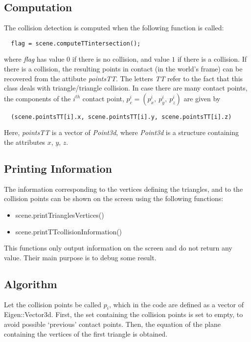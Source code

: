 \documentclass[11pt,a4paper]{article}
\begin{document}
\subsection*{Computation}
The collision detection is computed when the following function is called:
\begin{lstlisting}
  flag = scene.computeTTintersection();
\end{lstlisting}
where \textit{flag} has value $0$ if there is no collision, and value $1$ if there is a collision. If there is a collision, the resulting points in contact (in the world's frame) can be recovered from the attibute \textit{pointsTT}. The letters \textit{TT} refer to the fact that this class deals with triangle/triangle collision. In case there are many contact points, the components of the $i^{th}$ contact point, $p^i_c = (p^i_x, \ p^i_y, \ p^i_z)$ are given by
\begin{lstlisting}
  (scene.pointsTT[i].x, scene.pointsTT[i].y, scene.pointsTT[i].z)
\end{lstlisting}
Here, \textit{pointsTT} is a vector of \textit{Point3d}, where \textit{Point3d} is a structure containing the attributes $x$, $y$, $z$. 

\subsection*{Printing Information}
The information corresponding to the vertices defining the triangles, and to the collision points can be shown on the screen using the following functions:
\begin{itemize}
  \item scene.printTrianglesVertices()
  \item scene.printTTcollisionInformation()
\end{itemize}
This functions only output information on the screen and do not return any value. Their main purpose is to debug some result.

\subsection{Algorithm}

Let the collision points be called $p_i$, which in the code are defined as a vector of Eigen::Vector3d. 
First, the set containing the collision points is set to empty, to avoid possible `previous' contact points. Then, the equation of the plane containing the vertices of the first triangle is obtained. 
\end{document}
